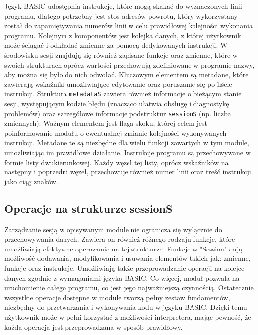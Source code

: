 \documentclass[shortabstract]{iithesis}
\begin{document}
Język BASIC udostępnia instrukcje, które mogą skakać do wyznaczonych linii programu, dlatego potrzebny jest stos adresów powrotu, który wykorzystany został do zapamiętywania numerów linii w celu prawidłowej kolejności wykonania programu. Kolejnym z komponentów jest kolejka danych, z której użytkownik może ściągać i odkładać zmienne za pomocą dedykowanych instrukcji. W środowisku sesji znajdują się również zapisane funkcje oraz zmienne, które w swoich strukturach oprócz wartości przechowują zdefiniowane w programie nazwy, aby można się było do nich odwołać. Kluczowym elementem są metadane, które zawierają wskaźniki umożliwiające edytowanie oraz poruszanie się po liście instrukcji. Struktura \texttt{metadataS} zawiera również informacje o bieżącym stanie sesji, występującym kodzie błędu (znacząco ułatwia obsługę i diagnostykę problemów) oraz szczegółowe informacje podstruktur \texttt{sessionS} (np. liczba zmiennych). Ważnym elementem jest flaga skoku, której celem jest poinformowanie modułu o ewentualnej zmianie kolejności wykonywanych instrukcji. Metadane te są niezbędne dla wielu funkcji zawartych w tym module, umożliwiając im prawidłowe działanie.
Instrukcje programu są przechowywane w formie listy dwukierunkowej. Każdy węzeł tej listy, oprócz wskaźników na następny i poprzedni węzeł, przechowuje również numer linii oraz treść instrukcji jako ciąg znaków.
\subsection{Operacje na strukturze sessionS}
Zarządzanie sesją w opisywanym module nie ogranicza się wyłącznie do przechowywania danych. Zawiera on również różnego rodzaju funkcje, które umożliwiają efektywne operowanie na tej strukturze. Funkcje w "Session" dają możliwość dodawania, modyfikowania i usuwania elementów takich jak: zmienne, funkcje oraz instrukcje. Umożliwiają także przeprowadzanie operacji na kolejce danych zgodnie z wymaganiami języka BASIC. Co więcej, moduł pozwala na uruchomienie całego programu, co jest jego najważniejszą czynnością. Ostatecznie wszystkie operacje dostępne w module tworzą pełny zestaw fundamentów, niezbędny do przetwarzania i wykonywania kodu w języku BASIC. Dzięki temu użytkownik może w pełni korzystać z możliwości interpretera, mając pewność, że każda operacja jest przeprowadzana w sposób prawidłowy.
\end{document}

